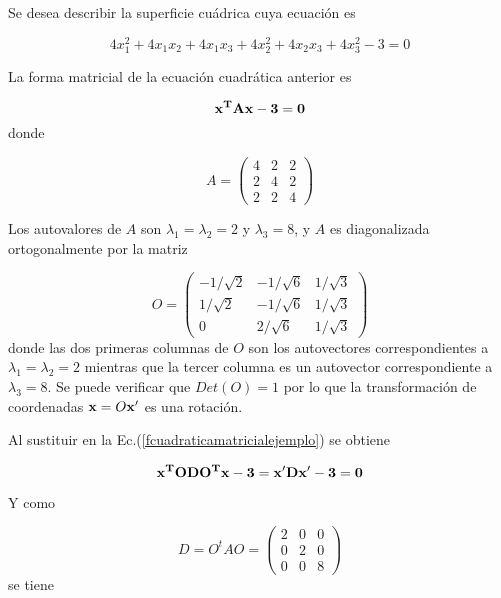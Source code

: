  \bigskip
 \begin{example}
 
 
 Se desea describir la superficie cuádrica cuya ecuación es 
 
 \begin{equation}
4x_1^{2}+4x_1x_2+4x_1x_3+4x_2^{2}+4x_2x_3+4x_3^{2}-3 = 0 \label{ejemplocuadrica}
\end{equation}

La forma matricial de la ecuación cuadrática anterior es 

\begin{equation}
\bf x ^T A \bf x -3 =0 \label{fcuadraticamatricialejemplo}
\end{equation}
  donde 
   
 \begin{equation}
  A=\left(\begin{array}{ccc} 4 & 2  & 2  \\2 & 4 & 2 \\2  & 2 & 4
\end{array}
 \right)
  \end{equation}
  
  Los autovalores de $A$ son $\lambda_1=\lambda_2=2$ y $\lambda_3=8$, y $A$ es diagonalizada ortogonalmente por la matriz  
  
  \begin{equation}
  O=\left(\begin{array}{ccc} -1/\sqrt 2  & -1/\sqrt 6   & 1/\sqrt 3   \\1/\sqrt 2  & -1/\sqrt 6  & 1/\sqrt 3  \\0  & 2/\sqrt 6 & 1/\sqrt 3
\end{array}
 \right)
  \end{equation}
 donde las dos primeras columnas de $O$ son los autovectores correspondientes a 
  $\lambda_1=\lambda_2=2$  mientras que la tercer  columna es un autovector correspondiente a 
$\lambda_3=8$. Se puede verificar que $Det(O)=1$ por lo que la transformación de coordenadas
$\bold x=O \bold x'$ es una rotación.

Al sustituir en la Ec.(\ref{fcuadraticamatricialejemplo})  se obtiene

\begin{equation}
\bf x^T O D O^T \bf x - 3 =  \bf x' D \bf x' -3 =0 \label{fcuadraticamatricialejemploprima}
\end{equation}

Y como 

\begin{equation}
  D= O^tAO=\left(\begin{array}{ccc} 2 & 0  & 0  \\0 & 2 & 0 \\0  & 0 & 8
\end{array}
 \right)
  \end{equation}
\noindent  
se tiene
  

\end{example}
